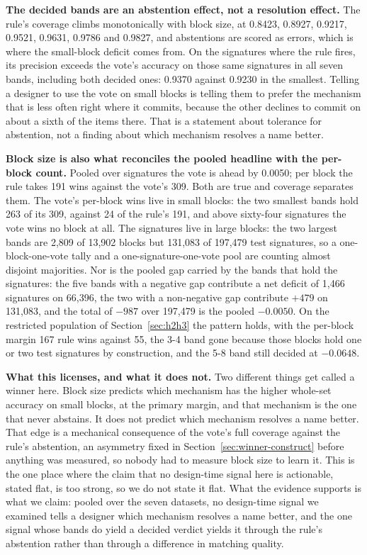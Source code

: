 \documentclass[11pt]{article}
\begin{document}
\textbf{The decided bands are an abstention effect, not a resolution effect.}
The rule's coverage climbs monotonically with block size, at 0.8423, 0.8927,
0.9217, 0.9521, 0.9631, 0.9786 and 0.9827, and abstentions are scored as
errors, which is where the small-block deficit comes from. On the signatures
where the rule fires, its precision exceeds the vote's accuracy on those same
signatures in all seven bands, including both decided ones: 0.9370 against
0.9230 in the smallest. Telling a designer
to use the vote on small blocks is telling them to prefer the mechanism that
is less often right where it commits, because the other declines to commit on
about a sixth of the items there. That is a statement about tolerance for
abstention, not a finding about which mechanism resolves a name better.

\textbf{Block size is also what reconciles the pooled headline with the
per-block count.} Pooled over signatures the vote is ahead by 0.0050; per
block the rule takes 191 wins against the vote's 309. Both are true and
coverage separates them. The vote's per-block wins live in small blocks: the
two smallest bands hold 263 of its 309, against 24 of the rule's 191, and
above sixty-four signatures the vote wins no block at all. The signatures live
in large blocks: the two largest bands are 2{,}809 of 13{,}902 blocks but
131{,}083 of 197{,}479 test signatures, so a one-block-one-vote tally and a
one-signature-one-vote pool are counting almost disjoint majorities. Nor is
the pooled gap carried by the bands that hold the signatures: the five bands
with a negative gap contribute a net deficit of 1{,}466 signatures on
66{,}396, the two with a non-negative gap contribute $+479$ on 131{,}083, and
the total of $-987$ over 197{,}479 is the pooled $-0.0050$. On the restricted
population of Section~\ref{sec:h2h3} the pattern holds, with the per-block
margin 167 rule wins against 55, the 3-4 band gone because those blocks hold
one or two test signatures by construction, and the 5-8 band still decided at
$-0.0648$.

\textbf{What this licenses, and what it does not.} Two different things get
called a winner here. Block size predicts which mechanism has the higher
whole-set accuracy on small blocks, at the primary margin, and that mechanism
is the one that never abstains. It does not predict which mechanism resolves a
name better. That edge is a mechanical consequence of the vote's full coverage
against the rule's abstention, an asymmetry fixed in
Section~\ref{sec:winner-construct} before anything was measured, so nobody had
to measure block size to learn it. This is the one place where the claim that
no design-time signal here is actionable, stated flat, is too strong, so we do
not state it flat. What the evidence supports is what we claim: pooled over
the seven datasets, no design-time signal we examined tells a designer which
mechanism resolves a name better, and the one signal whose bands do yield a
decided verdict yields it through the
rule's abstention rather than through a difference in matching quality.
\end{document}
